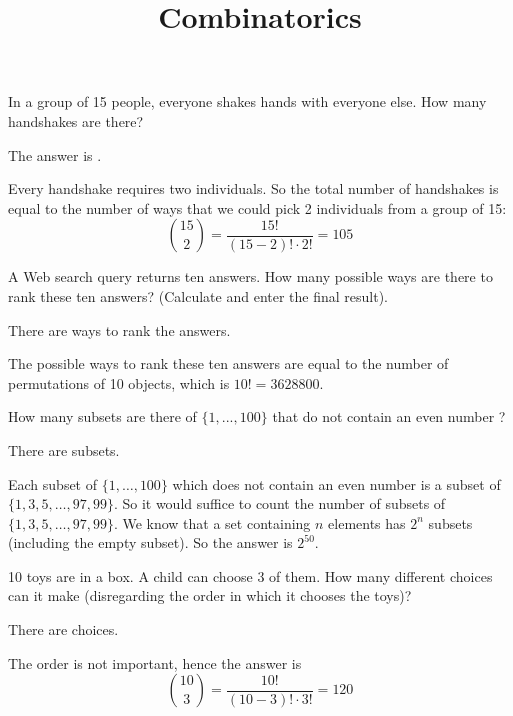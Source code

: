 \documentclass{ximera}
\title{Combinatorics}
\begin{document}
\maketitle



\begin{question}
In a group of 15 people, everyone shakes hands with everyone else.
How many handshakes are there?
\begin{solution}
The answer is .
\end{solution}
Every handshake requires two individuals. So the total number of
handshakes is equal to the number of ways that we could pick 2
individuals from a group of 15:
\[
\binom{15}{2} = \frac{15!}{(15 - 2)! \cdot 2!} = 105
\]
\end{question}

\begin{question}
A Web search query returns ten answers. How many possible ways are
there to rank these ten answers? (Calculate and enter the final result).
\begin{solution}
There are  ways to rank the answers.
\end{solution}
The possible ways to rank these ten answers are equal to the number of
permutations of 10 objects, which is $10! = 3628800$.
\end{question}

\begin{question}
How many subsets are there of $\{1, ... , 100\}$ that do not contain
an even number ?
\begin{solution}
There are  subsets.
\end{solution}
Each subset of $\{1 , \ldots , 100\}$ which does not contain an even
number is a subset of $\{1, 3, 5, \ldots , 97, 99\}$. So it would
suffice to count the number of subsets of $\{1, 3, 5, \ldots , 97,
99\}$. We know that a set containing $n$ elements has $2^n$ subsets
(including the empty subset). So the answer is $2^{50}$.
\end{question}

\begin{question}
10 toys are in a box.  A child can choose 3 of them.  How many
different choices can it make (disregarding the order in which it
chooses the toys)?
\begin{solution}
There are  choices.
\end{solution}
The order is not important, hence the answer is
\[
\binom{10}{3} = \frac{10!}{(10-3)! \cdot 3!} = 120
\]
\end{question}
\end{document}
